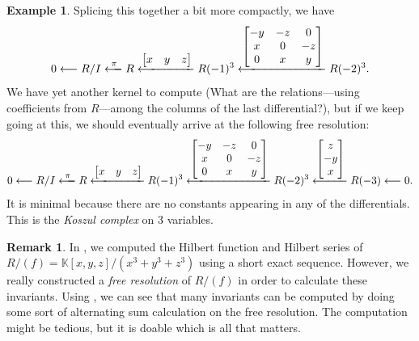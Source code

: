 \documentclass[12pt,a4paper]{article}
\newcommand{\KK}{\mathbb{K}}
\theoremstyle{definition}
\newtheorem{remark}[theorem]{Remark}
\newtheorem{example}[theorem]{Example}
\numberwithin{equation}{section}
\begin{document}
\begin{example}
    Splicing this together a bit more compactly, we have
    \begin{equation*}
        0 \longleftarrow R/I \xlongleftarrow[]{\pi} R \xlongleftarrow[]{\begin{bmatrix} x & y & z \end{bmatrix}} R(-1)^3 \xlongleftarrow[]{\begin{bmatrix} -y & -z & 0 \\ x & 0 & -z \\ 0 & x & y \end{bmatrix}} R(-2)^3.
    \end{equation*}
    We have yet another kernel to compute (What are the relations---using coefficients from $R$---among the columns of the last differential?), but if we keep going at this, we should eventually arrive at the following free resolution:
    \begin{equation*}
        0 \longleftarrow R/I \xlongleftarrow[]{\pi} R \xlongleftarrow[]{\begin{bmatrix} x & y & z \end{bmatrix}} R(-1)^3 \xlongleftarrow[]{\begin{bmatrix} -y & -z & 0 \\ x & 0 & -z \\ 0 & x & y \end{bmatrix}} R(-2)^3 \xlongleftarrow[]{\begin{bmatrix} z \\ -y \\ x \end{bmatrix}} R(-3) \longleftarrow 0.
    \end{equation*}
    It is minimal because there are no constants appearing in any of the differentials.
    This is the \emph{Koszul complex} on $3$ variables.
\end{example}

\begin{remark}
    In , we computed the Hilbert function and Hilbert series of $R/(f) = \KK[x,y,z]/(x^3 + y^3 + z^3)$ using a short exact sequence.
    However, we really constructed a \emph{free resolution} of $R/(f)$ in order to calculate these invariants.
    Using , we can see that many invariants can be computed by doing some sort of alternating sum calculation on the free resolution.
    The computation might be tedious, but it is doable which is all that matters.
\end{remark}
\end{document}
